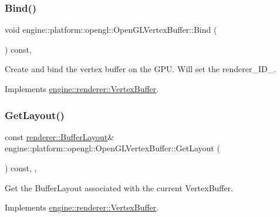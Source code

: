 \subsubsection{\texorpdfstring{Bind()}{Bind()}}
{\footnotesize\ttfamily void engine\+::platform\+::opengl\+::\+Open\+G\+L\+Vertex\+Buffer\+::\+Bind (\begin{DoxyParamCaption}{ }\end{DoxyParamCaption}) const\hspace{0.3cm}{\ttfamily [override]}, {\ttfamily [virtual]}}

Create and bind the vertex buffer on the G\+PU. Will set the renderer\+\_\+\+I\+D\+\_\+. 

Implements \hyperlink{classengine_1_1renderer_1_1VertexBuffer}{engine\+::renderer\+::\+Vertex\+Buffer}.

\mbox{\label{classengine_1_1platform_1_1opengl_1_1OpenGLVertexBuffer_a0d4f81503171f6bbe41ece0fada23390}} 
\subsubsection{\texorpdfstring{Get\+Layout()}{GetLayout()}}
{\footnotesize\ttfamily const \hyperlink{classengine_1_1renderer_1_1BufferLayout}{renderer\+::\+Buffer\+Layout}\& engine\+::platform\+::opengl\+::\+Open\+G\+L\+Vertex\+Buffer\+::\+Get\+Layout (\begin{DoxyParamCaption}{ }\end{DoxyParamCaption}) const\hspace{0.3cm}{\ttfamily [inline]}, {\ttfamily [override]}, {\ttfamily [virtual]}}

Get the Buffer\+Layout associated with the current Vertex\+Buffer. 

Implements \hyperlink{classengine_1_1renderer_1_1VertexBuffer}{engine\+::renderer\+::\+Vertex\+Buffer}.

\mbox{\label{classengine_1_1platform_1_1opengl_1_1OpenGLVertexBuffer_a957a9dc55dc35ce4302654e1a394e5f8}} 
